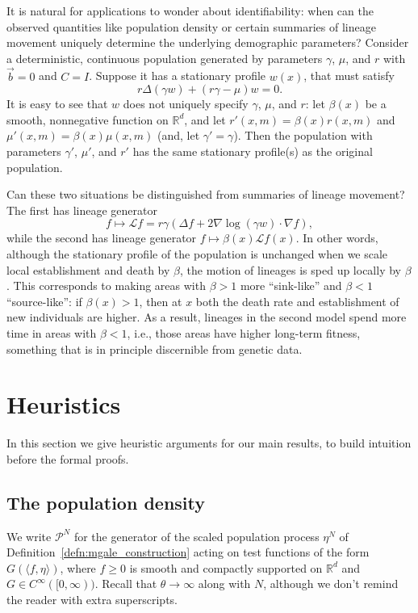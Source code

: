\documentclass[12pt]{article}
\newcommand{\IR}{\mathbb R}
\newcommand{\grad}{\nabla}
\newcommand{\meanq}{\vec b}    %
\newcommand{\covq}{C}     %
\newcommand{\Lgen}{\mathcal{L}}    %
\newcommand{\Pgen}{\mathcal{P}}    %
\begin{document}
It is natural for applications to wonder about identifiability:
when can the observed quantities like population density
or certain summaries of lineage movement uniquely determine
the underlying demographic parameters?
Consider a deterministic,
continuous population generated by parameters $\gamma$, $\mu$, and $r$
with $\meanq = 0$ and $\covq = I$.
Suppose it has a stationary profile $w(x)$, that must satisfy
$$
   r \Delta(\gamma w) + (r \gamma - \mu) w = 0 .
$$
It is easy to see that $w$ does not uniquely specify $\gamma$, $\mu$, and $r$:
let $\beta(x)$ be a smooth, nonnegative function on $\IR^d$,
and let $r'(x, m) = \beta(x) r(x, m)$ and $\mu'(x, m) = \beta(x) \mu(x, m)$
(and, let $\gamma' = \gamma$).
Then the population with parameters $\gamma'$, $\mu'$, and $r'$
has the same stationary profile(s) as the original population.

Can these two situations be distinguished from summaries of lineage movement?
The first has lineage generator
\[
    f \mapsto \Lgen f = r \gamma \left( \Delta f + 2 \grad \log(\gamma w) \cdot \grad f \right),
\]
while the second has lineage generator $f \mapsto \beta(x) \Lgen f(x)$.
In other words,
although the stationary profile of the population is unchanged when we scale
local establishment and death by $\beta$,
the motion of lineages is sped up locally by $\beta$.
This corresponds to making areas with $\beta > 1$ more ``sink-like'' and $\beta < 1$ ``source-like'':
if $\beta(x) > 1$, then at $x$ both the death rate and establishment of new individuals are higher.
As a result, lineages in the second model spend more time in areas with $\beta < 1$,
i.e., those areas have higher long-term fitness,
something that is in principle discernible from genetic data.


\section{Heuristics}
    \label{sec:heuristics}

In this section we give heuristic arguments for our main results,
to build intuition before the formal proofs.

\subsection{The population density}
    \label{sec:population_heuristics}

We write $\Pgen^N$
for the generator of the scaled population process $\eta^N$
of Definition~\ref{defn:mgale_construction}
acting on test functions of the form $G( \langle f, \eta \rangle )$,
where $f \geq 0$ is smooth and compactly supported on $\IR^d$ and 
$G \in C^\infty ([0,\infty))$.
Recall that $\theta \to \infty$ along with $N$,
although we don't remind the reader with extra superscripts.
\end{document}
